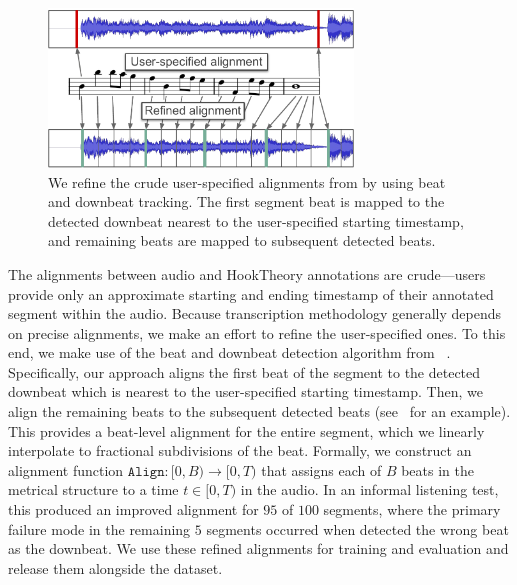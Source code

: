 \begin{figure}
    \centering
    \includegraphics[width=8.1cm]{figs/alignment.pdf}
    \caption{We refine the crude user-specified alignments from \hooktheory{} by using beat and downbeat tracking. The first segment beat is mapped to the detected downbeat nearest to the user-specified starting timestamp, and remaining beats are mapped to subsequent detected beats.}
 \label{fig:alignment}
 \vspace{-5mm}
\end{figure}

The alignments between audio and HookTheory annotations are crude---users provide only an approximate starting and ending timestamp of their annotated segment within the audio. 
Because transcription methodology generally depends on precise alignments, we make an effort to refine the user-specified ones. 
To this end, we make use of the beat and downbeat detection algorithm from \madmom{}~\cite{bock2016joint,bock2016madmom}. 
Specifically, our approach aligns the first beat of the segment to the detected downbeat which is nearest to the user-specified starting timestamp. 
Then, we align the remaining beats to the subsequent detected beats (see~ for an example). 
This provides a beat-level alignment for the entire segment, which we linearly interpolate to fractional subdivisions of the beat. 
Formally, we construct an alignment function $\texttt{Align} : [0,B) \to [0,T)$ that assigns each of $B$ beats in the metrical structure to a time $t \in [0,T)$ in the audio.
In an informal listening test, this produced an improved alignment for $95$ of $100$ segments, 
where the primary failure mode in the remaining $5$ segments occurred when \madmom{} detected the wrong beat as the downbeat. 
We use these refined alignments for training and evaluation and release them alongside the dataset.

\subsection{\Beatpooling}
\label{sec:beatpool}

